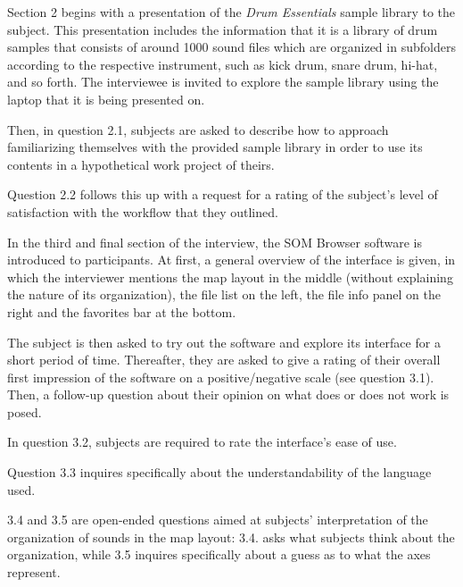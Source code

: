 \bigskip

Section 2 begins with a presentation of the \textit{Drum Essentials} sample
library to the subject. This presentation includes the information that it is a
library of drum samples that consists of around 1000 sound files which are
organized in subfolders according to the respective instrument, such as kick
drum, snare drum, hi-hat, and so forth. The interviewee is invited to explore
the sample library using the laptop that it is being presented on.

\par
Then, in
question 2.1, subjects are asked to describe how to approach familiarizing
themselves with the provided sample library in order to use its contents in a
hypothetical work project of theirs.

\par
Question 2.2 follows this up with a
request for a rating of the subject's level of satisfaction with the workflow
that they outlined.

\bigskip

In the third and final section of the interview, the SOM Browser software is
introduced to participants. At first, a general overview of the interface is
given, in which the interviewer mentions the map layout in the middle (without
explaining the nature of its organization), the file list on the left, the file
info panel on the right and the favorites bar at the bottom.

\par
The subject is
then asked to try out the software and explore its interface for a short period
of time. Thereafter, they are asked to give a rating of their overall first
impression of the software on a positive/negative scale (see question 3.1).
Then, a follow-up question about their opinion on what does or does not work is
posed.

\par
In question 3.2, subjects are required to rate the interface's ease of
use.

\par
Question 3.3 inquires specifically about the understandability of the
language used.

\par
3.4 and 3.5 are open-ended questions aimed at subjects'
interpretation of the organization of sounds in the map layout: 3.4. asks what
subjects think about the organization, while 3.5 inquires specifically about
a guess as to what the axes represent.

